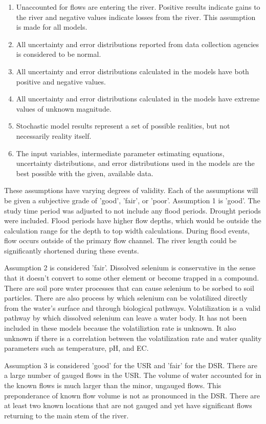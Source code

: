 \begin{linenumbers}[1]
\begin{enumerate}
\item Unaccounted for flows are entering the river.  Positive results indicate gains to the river and negative values indicate losses from the river.  This assumption is made for all models.
\item All uncertainty and error distributions reported from data collection agencies is considered to be normal.
\item All uncertainty and error distributions calculated in the models have both positive and negative values.
\item All uncertainty and error distributions calculated in the models have extreme values of unknown magnitude.
\item Stochastic model results represent a set of possible realities, but not necessarily reality itself.
\item The input variables, intermediate parameter estimating equations, uncertainty distributions, and error distributions used in the models are the best possible with the given, available data.
\end{enumerate}

These assumptions have varying degrees of validity.  Each of the assumptions will be given a subjective grade of 'good', 'fair', or 'poor'.  
Assumption 1 is 'good'.  The study time period was adjusted to not include any flood periods.  Drought periods were included.  Flood periods have higher flow depths, which would be outside the calculation range for the depth to top width calculations.  During flood events, flow occurs outside of the primary flow channel.  The river length could be significantly shortened during these events.

Assumption 2 is considered 'fair'.  Dissolved selenium is conservative in the sense that it doesn't convert to some other element or become trapped in a compound.  There are soil pore water processes that can cause selenium to be sorbed to soil particles.  There are also process by which selenium can be volatilized directly from the water's surface and through biological pathways.  Volatilization is a valid pathway by which dissolved selenium can leave a water body.  It has not been included in these models because the volatiliztion rate is unknown.  It also unknown if there is a correlation between the volatilization rate and water quality parameters such as temperature, pH, and EC.

Assumption 3 is considered 'good' for the USR and 'fair' for the DSR.  There are a large number of gauged flows in the USR.  The volume of water accounted for in the known flows is much larger than the minor, ungauged flows.  This preponderance of known flow volume is not as pronounced in the DSR.  There are at least two known locations that are not gauged and yet have significant flows returning to the main stem of the river.


\end{linenumbers}
